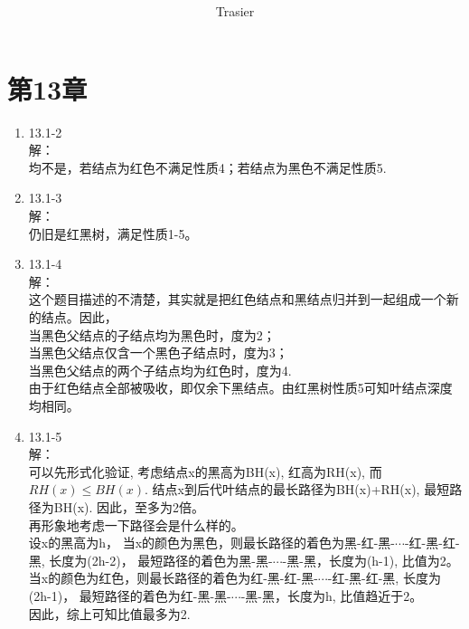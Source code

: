 \documentclass[UTF8]{ctexart}
\begin{document}
\title{\\}
\vspace{2cm}
\author{\Large Trasier}
\date{}
\maketitle

\section*{第13章}
\begin{enumerate}
    \item 13.1-2 \\
    解：\\
        均不是，若结点为红色不满足性质4；若结点为黑色不满足性质5.
		
	\item 13.1-3 \\
	解：\\
		仍旧是红黑树，满足性质1-5。
		
	\item 13.1-4 \\
	解：\\
		这个题目描述的不清楚，其实就是把红色结点和黑结点归并到一起组成一个新的结点。因此，\\
		当黑色父结点的子结点均为黑色时，度为2；	\\
		当黑色父结点仅含一个黑色子结点时，度为3；	\\
		当黑色父结点的两个子结点均为红色时，度为4.	\\
		由于红色结点全部被吸收，即仅余下黑结点。由红黑树性质5可知叶结点深度均相同。
	
	\item 13.1-5 \\
	解：\\
		可以先形式化验证, 考虑结点x的黑高为BH(x), 红高为RH(x), 而$RH(x) \le BH(x)$.
		结点x到后代叶结点的最长路径为BH(x)+RH(x), 最短路径为BH(x). 因此，至多为2倍。\\
		再形象地考虑一下路径会是什么样的。\\
		设x的黑高为h，
		当x的颜色为黑色，则最长路径的着色为黑-红-黑-$\cdots$-红-黑-红-黑, 长度为(2h-2)，
		最短路径的着色为黑-黑-$\cdots$-黑-黑，长度为(h-1), 比值为2。\\
		当x的颜色为红色，则最长路径的着色为红-黑-红-黑-$\cdots$-红-黑-红-黑, 长度为(2h-1)，
		最短路径的着色为红-黑-黑-$\cdots$-黑-黑，长度为h, 比值趋近于2。\\
		因此，综上可知比值最多为2.
		

\end{enumerate}
\end{document}
